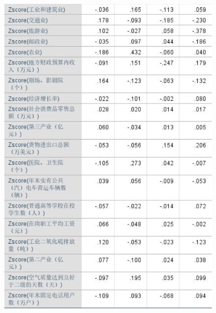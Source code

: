 \documentclass{whutmod}
\begin{document}
\begin{figure}[H]
	\centering
	\includegraphics[width=\textwidth]{figures/6.png}
	
\end{figure}
\end{document}
